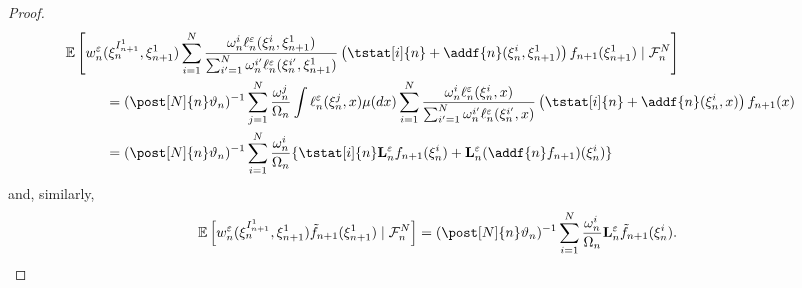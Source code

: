 \begin{proof}
\begin{align*} 
\lefteqn{\pE \left[ \wgtfuncmod{n}(\epart{n}{\ind{n + 1}{1}}, \epart{n + 1}{1}) \sum_{i = 1}^\N \frac{\ewghthat{n}{i} \udmod{n} (\epart{n}{i}, \epart{n + 1}{1})}{\sum_{i' = 1}^{\N} \ewghthat{n}{i'} \udmod{n} (\epart{n}{i'}, \epart{n + 1}{1})} \left(\tstat[i]{n} + \addf{n}(\epart{n}{i}, \epart{n + 1}{1}) \right) f_{n + 1}(\epart{n + 1}{1}) \cond \calF{n}{\N} \right]} \hspace{10mm} \\
&= (\post[\N]{n} \adjfuncforward{n})^{-1} \sum_{j = 1}^\N \frac{\ewght{n}{j}}{\sumwght{n}} \int \udmod{n}(\epart{n}{j}, x) \mu(\rmd x) \sum_{i = 1}^\N \frac{\ewghthat{n}{i} \udmod{n} (\epart{n}{i}, x)}{\sum_{i' = 1}^\N \ewghthat{n}{i'} \udmod{n} (\epart{n}{i'}, x)} \left(\tstat[i]{n} + \addf{n}(\epart{n}{i}, x) \right) f_{n + 1}(x) \\
&= (\post[\N]{n} \adjfuncforward{n})^{-1} \sum_{i = 1}^\N \frac{\ewght{n}{i}}{\sumwght{n}} \{ \tstat[i]{n} \ukmod{n} f_{n + 1}(\epart{n}{i}) + \ukmod{n}(\addf{n} f_{n + 1})(\epart{n}{i}) \}
\end{align*}
and, similarly, 
\begin{equation*}
 \pE \left[\wgtfuncmod{n}(\epart{n}{\ind{n + 1}{1}}, \epart{n + 1}{1}) \ftd{n + 1}(\epart{n + 1}{1}) \cond \calF{n}{\N} \right] = (\post[\N]{n} \adjfuncforward{n})^{-1} \sum_{i = 1}^\N \frac{\ewght{n}{i}}{\sumwght{n}} \ukmod{n} \ftd{n + 1}(\epart{n}{i}). 
\end{equation*}
\end{proof}

